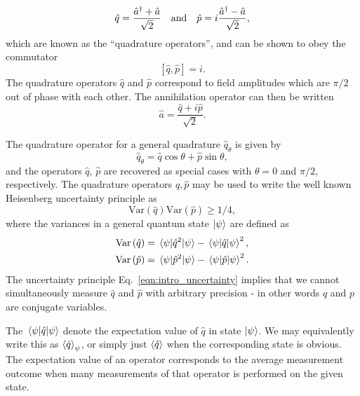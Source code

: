 \begin{equation}\label{eqn:intro_quadrature}
\hat{q} = \frac{\hat{a}^\dagger + \hat{a}}{\sqrt{2}} \qq{and} \hat{p} = i \frac{\hat{a}^\dagger - \hat{a}}{\sqrt{2}},
\end{equation}
which are known as the ``quadrature operators'', and can be shown to obey the commutator
\begin{equation}\label{eqn:intro_quadrature_commutator}
\left[\hat{q}, \hat{p}\right] = i.
\end{equation}
The quadrature operators $\hat{q}$ and $\hat{p}$ correspond to field amplitudes which are $\pi/2$ out of phase with each other. The annihilation operator can then be written
\begin{equation}
\hat{a} = \frac{\hat{q} + i \hat{p}}{\sqrt{2}}.
\end{equation}

\noindent The quadrature operator for a general quadrature $\hat{q}_\theta$ is given by
\begin{equation}
\hat{q}_\theta = \hat{q} \cos\theta  + \hat{p} \sin\theta ,
\end{equation}
and the operators $\hat{q}$, $\hat{p}$ are recovered as special cases with $\theta = 0$ and $\pi/2$, respectively. The quadrature operators $\hat{q}, \hat{p}$ may be used to write the well known Heisenberg uncertainty principle as
\begin{equation}\label{eqn:intro_uncertainty}
\text{Var}\left(\hat{q}\right)\text{Var}\left(\hat{p}\right) \ge 1/4, %
\end{equation} 
where the variances in a general quantum state $\ket{\psi}$ are defined as
\begin{align}
\text{Var}\left(\hat{q}\right) &= \mel{\psi}{\hat{q}^2}{\psi} - \mel{\psi}{\hat{q}}{\psi}^2, \notag \\
\text{Var}\left(\hat{p}\right) &= \mel{\psi}{\hat{p}^2}{\psi} - \mel{\psi}{\hat{p}}{\psi}^2.
\end{align}
The uncertainty principle Eq.~\ref{eqn:intro_uncertainty} implies that we cannot simultaneously measure $\hat{q}$ and $\hat{p}$ with arbitrary precision - in other words $q$ and $p$ are conjugate variables.

The $\mel{\psi}{\hat{q}}{\psi}$ denote the expectation value of $\hat{q}$ in state $\ket{\psi}$. We may equivalently write this as $\ev{\hat{q}}_\psi$, or simply just $\ev{\hat{q}}$ when the corresponding state is obvious. The expectation value of an operator corresponds to the average measurement outcome when many measurements of that operator is performed on the given state.

